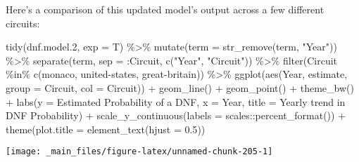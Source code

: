 \documentclass[
]{book}
\newenvironment{Shaded}{\begin{snugshade}}{\end{snugshade}}
\newcommand{\AttributeTok}[1]{\textcolor[rgb]{0.77,0.63,0.00}{#1}}
\newcommand{\FloatTok}[1]{\textcolor[rgb]{0.00,0.00,0.81}{#1}}
\newcommand{\FunctionTok}[1]{\textcolor[rgb]{0.00,0.00,0.00}{#1}}
\newcommand{\NormalTok}[1]{#1}
\newcommand{\SpecialCharTok}[1]{\textcolor[rgb]{0.00,0.00,0.00}{#1}}
\newcommand{\StringTok}[1]{\textcolor[rgb]{0.31,0.60,0.02}{#1}}
\begin{document}
Here's a comparison of this updated model's output across a few different circuits:

\begin{Shaded}
\begin{Highlighting}[]
\FunctionTok{tidy}\NormalTok{(dnf.model}\FloatTok{.2}\NormalTok{, }\AttributeTok{exp =}\NormalTok{ T) }\SpecialCharTok{\%\textgreater{}\%}
  \FunctionTok{mutate}\NormalTok{(}\AttributeTok{term =} \FunctionTok{str\_remove}\NormalTok{(term, }\StringTok{"Year"}\NormalTok{)) }\SpecialCharTok{\%\textgreater{}\%}
  \FunctionTok{separate}\NormalTok{(term, }\AttributeTok{sep =} \StringTok{\textquotesingle{}:Circuit\textquotesingle{}}\NormalTok{, }\FunctionTok{c}\NormalTok{(}\StringTok{"Year"}\NormalTok{, }\StringTok{"Circuit"}\NormalTok{)) }\SpecialCharTok{\%\textgreater{}\%}
  \FunctionTok{filter}\NormalTok{(Circuit }\SpecialCharTok{\%in\%} \FunctionTok{c}\NormalTok{(}\StringTok{\textquotesingle{}monaco\textquotesingle{}}\NormalTok{, }\StringTok{\textquotesingle{}united{-}states\textquotesingle{}}\NormalTok{, }\StringTok{\textquotesingle{}great{-}britain\textquotesingle{}}\NormalTok{)) }\SpecialCharTok{\%\textgreater{}\%} 
  \FunctionTok{ggplot}\NormalTok{(}\FunctionTok{aes}\NormalTok{(Year, estimate, }\AttributeTok{group =}\NormalTok{ Circuit, }\AttributeTok{col =}\NormalTok{ Circuit)) }\SpecialCharTok{+}
  \FunctionTok{geom\_line}\NormalTok{() }\SpecialCharTok{+}
  \FunctionTok{geom\_point}\NormalTok{() }\SpecialCharTok{+} 
  \FunctionTok{theme\_bw}\NormalTok{() }\SpecialCharTok{+}
  \FunctionTok{labs}\NormalTok{(}\AttributeTok{y =} \StringTok{\textquotesingle{}Estimated Probability of a DNF\textquotesingle{}}\NormalTok{,}
       \AttributeTok{x =} \StringTok{\textquotesingle{}Year\textquotesingle{}}\NormalTok{,}
       \AttributeTok{title =} \StringTok{\textquotesingle{}Yearly trend in DNF Probability\textquotesingle{}}\NormalTok{) }\SpecialCharTok{+}
\FunctionTok{scale\_y\_continuous}\NormalTok{(}\AttributeTok{labels =}\NormalTok{ scales}\SpecialCharTok{::}\FunctionTok{percent\_format}\NormalTok{()) }\SpecialCharTok{+}
  \FunctionTok{theme}\NormalTok{(}\AttributeTok{plot.title =} \FunctionTok{element\_text}\NormalTok{(}\AttributeTok{hjust =} \FloatTok{0.5}\NormalTok{))}
\end{Highlighting}
\end{Shaded}

\begin{center}\texttt{[image: \_main\_files/figure-latex/unnamed-chunk-205-1]} \end{center}
\end{document}
